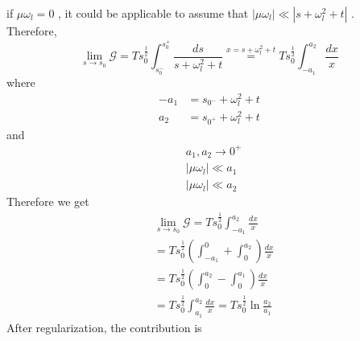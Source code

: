 \documentclass{article}
\begin{document}
if $\mu \omega_l=0$ , it could be applicable to assume that $\left|\mu \omega_l\right|\ll \left|s+\omega_l^2+t\right|$ .
\\Therefore,
\begin{equation}
        \lim_{s\rightarrow s_0}\mathcal{G} 
        =T s_0^{\frac{1}{2}}\int_{s_0^-}^{s_0^+}\frac{ds}{s+\omega_l^2+t}
        \stackrel{x=s+\omega_l^2+t}{=}T s_0^{\frac{1}{2}}\int_{-a_1}^{a_2}\frac{dx}{x}     
\end{equation} 
where 
\begin{equation}
    \begin{split}
        -a_1&=s_{0^-}+\omega_l^2+t \\
        a_2&=s_{0^+}+\omega_l^2+t
    \end{split}
\end{equation} 
and 
\begin{equation}
    \begin{split}
        &a_1,a_2\rightarrow0^+\\
        &\left|\mu \omega_l\right|\ll a_1\\
        &\left|\mu \omega_l\right|\ll a_2 
    \end{split}
\end{equation}
Therefore we get 
\begin{equation}
    \begin{split}
        &\lim_{s\rightarrow s_0}\mathcal{G} 
        =T s_0^{\frac{1}{2}}\int_{-a_1}^{a_2}\frac{dx}{x}\\
        &=T s_0^{\frac{1}{2}}\left(\int_{-a_1}^{0}+\int_{0}^{a_2}\right)\frac{dx}{x}\\
        &=T s_0^{\frac{1}{2}}\left(\int_{0}^{a_2}-\int_{0}^{a_1}\right)\frac{dx}{x}\\
        &=T s_0^{\frac{1}{2}}\int_{a_1}^{a_2}\frac{dx}{x}
        =T s_0^{\frac{1}{2}}\ln \frac{a_2}{a_1}
    \end{split}
\end{equation} 
After regularization, the contribution is
\end{document}
